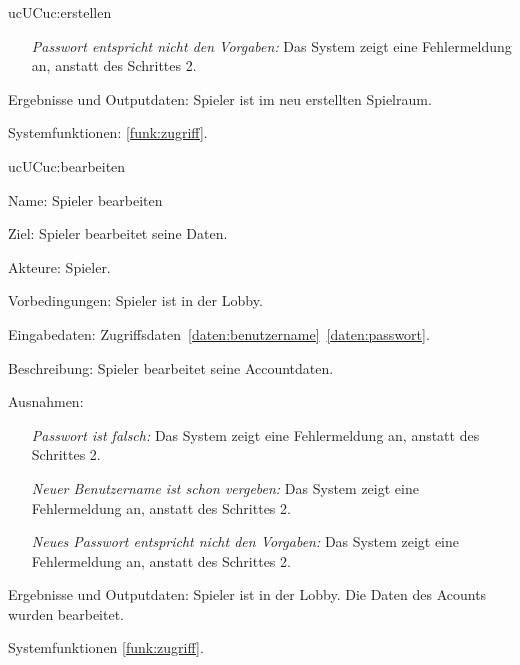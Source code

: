 \begin{description}[leftmargin=5em, style=sameline]
\begin{lhp}{uc}{UC}{uc:erstellen}
\begin{itemize}
				\item[] \textit{Passwort entspricht nicht den Vorgaben:} Das System zeigt eine Fehlermeldung an, anstatt des Schrittes 2.
				
			\end{itemize}
		\item [Ergebnisse und Outputdaten:] Spieler ist im neu erstellten Spielraum.	
		\item [Systemfunktionen:] \ref{funk:zugriff}.
	\end{lhp}
	
	\begin{lhp}{uc}{UC}{uc:bearbeiten}
		\item [Name:] Spieler bearbeiten
		\item [Ziel:] Spieler bearbeitet seine Daten.
		\item [Akteure:] Spieler.
		\item [Vorbedingungen:] Spieler ist in der Lobby.
		\item [Eingabedaten:] Zugriffsdaten~\ref{daten:benutzername}~\ref{daten:passwort}.
		\item [Beschreibung:] Spieler bearbeitet seine Accountdaten.
		\item [Ausnahmen:] \hfill
			\begin{itemize} 
			    \item[] \textit{Passwort ist falsch:} Das System zeigt eine Fehlermeldung an, anstatt des Schrittes 2.
			    
				\item[] \textit{Neuer Benutzername ist schon vergeben:} Das System zeigt eine Fehlermeldung an, anstatt des Schrittes 2.
				
				\item[] \textit{Neues Passwort entspricht nicht den Vorgaben:} Das System zeigt eine Fehlermeldung an, anstatt des Schrittes 2.
				
			\end{itemize}
		\item [Ergebnisse und Outputdaten:] Spieler ist in der Lobby. Die Daten des Acounts wurden bearbeitet.
		\item [Systemfunktionen] \ref{funk:zugriff}.
	\end{lhp}
	

\end{description}
